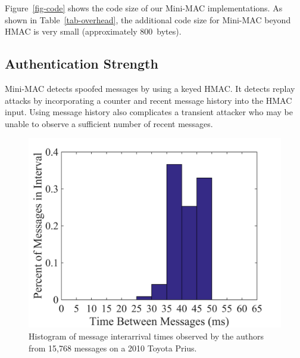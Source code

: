 Figure~\ref{fig-code} shows the code size of our Mini-MAC implementations.
As shown in Table~\ref{tab-overhead}, the additional code size for Mini-MAC beyond
HMAC is very small (approximately 800~bytes).
	
\subsection{Authentication Strength}
\label{security}

Mini-MAC detects spoofed messages by using a keyed HMAC.  It detects replay attacks
by incorporating a counter and recent message history into the HMAC input.  Using message
history also complicates a transient attacker who may be unable to observe a sufficient
number of recent messages.  

	\selectfont
	\begin{figure}
		\centering
		\includegraphics[width=\columnwidth]{figures/relative_histogram.png}
		\caption{{\selectfont Histogram 
		of message interarrival times observed by the authors from 
		15,768 messages on a 2010 Toyota Prius. }}
		\label{fig-msgdelay}
	\end{figure}

